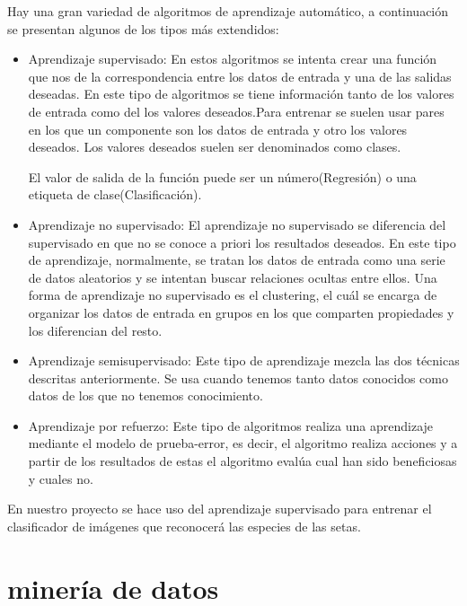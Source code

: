 Hay una gran variedad de algoritmos de aprendizaje automático, a continuación se presentan algunos de los tipos más extendidos:
\begin{itemize}

	\item{Aprendizaje supervisado}: En estos algoritmos se intenta crear una función que nos de la correspondencia entre los datos de entrada y una de las salidas deseadas. En este tipo de algoritmos se tiene información tanto de los valores de entrada como del los valores deseados.Para entrenar se suelen usar pares en los que un componente son los datos de entrada y otro los valores deseados. Los valores deseados suelen ser denominados como clases.\cite{wiki:aprendizaheSupervisado}
	
	El valor de salida de la función puede ser un número(Regresión) o una etiqueta de clase(Clasificación).
	\item{Aprendizaje no supervisado}: El aprendizaje no supervisado se diferencia del supervisado en que no se conoce a priori los resultados deseados. En este tipo de aprendizaje, normalmente, se tratan los datos de entrada como una serie de datos aleatorios y se intentan buscar relaciones ocultas entre ellos.
	Una forma de aprendizaje no supervisado es el clustering, el cuál se encarga de organizar los datos de entrada en grupos en los que comparten propiedades y los diferencian del resto.\cite{wiki:aprendizajeNoSupervisado}
	
	\item{Aprendizaje semisupervisado}: Este tipo de aprendizaje mezcla las dos técnicas descritas anteriormente. Se usa cuando tenemos tanto datos conocidos como datos de los que no tenemos conocimiento.
	
	\item{Aprendizaje por refuerzo}: Este tipo de algoritmos realiza una aprendizaje mediante el modelo de prueba-error, es decir, el algoritmo realiza acciones y a partir de los resultados de estas el algoritmo evalúa cual han sido beneficiosas y cuales no.
\end{itemize}
	
En nuestro proyecto se hace uso del aprendizaje supervisado para entrenar el clasificador de imágenes que reconocerá las especies de las setas.
\cite{wiki:aprendizajeAutomatico}

\section{minería de datos}

